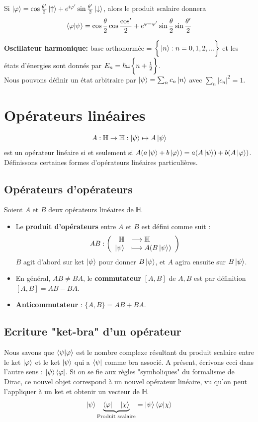 \documentclass[../notesdecours.tex]{subfiles}
\begin{document}
Si $\ket{\varphi} = \cos\frac{\theta'}{2}\ket{\uparrow}+e^{i\varphi'}\sin\frac{\theta'}{2}\ket{\downarrow}$, alors le produit scalaire donnera
\begin{equation}
\braket{\varphi|\psi} = \cos\frac{\theta}{2}\cos\frac{\cos'}{2}+e^{\varphi-\varphi'}\sin\frac{\theta}{2}\sin\frac{\theta'}{2}
\end{equation}

\textbf{Oscillateur harmonique:} base orthonormée = $\bigg\{\ket{n} : n=0,1,2,...\bigg\}$ et les états d'énergies sont donnés par $E_n = \hbar\omega\bigg\{n+\frac{1}{2}\bigg\}$.\\

Nous pouvons définir un état arbitraire par $\ket{\psi} = \sum_n c_n \ket{n}$ avec $\sum_n |c_n| ^2 = 1$.

\section{Opérateurs linéaires}
$$A : \mathbb{H} \rightarrow \mathbb{H} : \ket{\psi} \mapsto A\ket{\psi}$$ est un opérateur linéaire si et seulement si $A(a\ket{\psi}+b\ket{\varphi}) = a(A\ket{\psi})+b(A\ket{\varphi})$. Définissons certaines formes d'opérateurs linéaires particulières.

\subsection{Opérateurs d'opérateurs}
Soient $A$ et $B$ deux opérateurs linéaires de $\mathbb{H}$.
\begin{itemize}
\item Le \textbf{produit d'opérateurs} entre $A$ et $B$ est défini comme suit :
$$AB : \left( 
	\begin{array}{rl}
		\mathbb{H} &\longrightarrow \mathbb{H} \\
		\ket \psi &\longmapsto A(B\ket \psi)
	\end{array}
\right) $$
$B$ agit d'abord sur ket $\ket{\psi}$ pour donner $B\ket{\psi}$, et $A$ agira ensuite sur $B\ket{\psi}$.
\item En général, $AB\neq BA$, le \textbf{commutateur} $[A,B]$ de $A,B$ est par définition $[A,B] = AB-BA$.
\item \textbf{Anticommutateur} : $\bigg\{A,B\bigg\} = AB+BA$.
\end{itemize}
\subsection{Ecriture "ket-bra" d'un opérateur}
Nous savons que $\braket{\psi | \varphi}$ est le nombre complexe résultant du produit scalaire entre le ket $\ket \varphi$ et le ket $\ket \psi$ qui a $\bra \psi$ comme bra associé. A présent, écrivons ceci dans l'autre sens : $\ket \psi \bra \varphi$. Si on se fie aux règles "symboliques" du formalisme de Dirac, ce nouvel objet correspond à un nouvel opérateur linéaire, vu qu'on peut l'appliquer à un ket et obtenir un vecteur de $\mathbb{H}$.
$$\ket \psi \underbrace{\bra \varphi \quad \ket \chi}_{\text{Produit scalaire}} = \ket \psi \braket{\varphi | \chi}$$
\end{document}
